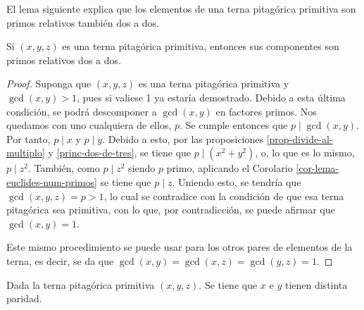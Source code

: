 El lema siguiente explica que los elementos de una terna pitagórica
primitiva son primos relativos también dos a dos.

\begin{lemma}\label{lema-terna-pit-prim-dos-a-dos}
  Si $(x, y, z)$ es una terna pitagórica primitiva, entonces sus componentes
  son primos relativos dos a dos.
\end{lemma}

\begin{proof}
  Suponga que $(x, y, z)$ es una terna pitagórica primitiva y $\gcd(x, y) >
  1$, pues si valiese 1 ya estaría demostrado. Debido a esta última
  condición, se podrá descomponer a $\gcd(x, y)$ en factores primos. Nos
  quedamos con uno cualquiera de ellos, $p$. Se cumple entonces que $p \mid
  \gcd(x, y)$. Por tanto, $p \mid x$ y $p \mid y$. Debido a esto, por las
  proposiciones \ref{prop-divide-al-multiplo} y \ref{princ-dos-de-tres}, se
  tiene que $p \mid (x^2 + y^2)$, o, lo que es lo mismo, $p \mid z^2$.
  También, como $p \mid z^2$ siendo $p$ primo, aplicando el Corolario
  \ref{cor-lema-euclides-num-primos} se tiene que $p \mid z$. Uniendo esto,
  se tendría que $\gcd(x, y, z) = p > 1$, lo cual se contradice con la
  condición de que esa terna pitagórica sea primitiva, con lo que, por
  contradicción, se puede afirmar que $\gcd(x, y) = 1$.

  Este mismo procedimiento se puede usar para los otros pares de elementos
  de la terna, es decir, se da que $\gcd(x, y) = \gcd(x, z) = \gcd(y, z) =
  1$.
\end{proof}

\begin{lemma}\label{lema-ternas-pit-prim-paridad}
  Dada la terna pitagórica primitiva $(x, y, z)$. Se tiene que $x$ e $y$
  tienen distinta paridad.
\end{lemma}

